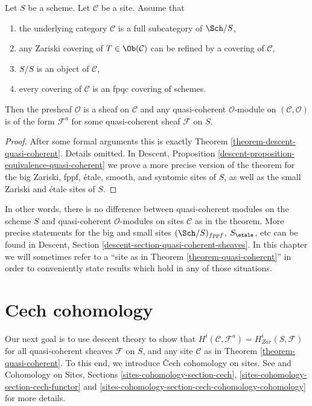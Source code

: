 \begin{theorem}
\label{theorem-quasi-coherent}
Let $S$ be a scheme.
Let $\mathcal{C}$ be a site. Assume that
\begin{enumerate}
\item the underlying category $\mathcal{C}$ is a
full subcategory of $\Sch/S$,
\item any Zariski covering of $T \in \Ob(\mathcal{C})$
can be refined by a covering of $\mathcal{C}$,
\item $S/S$ is an object of $\mathcal{C}$,
\item every covering of $\mathcal{C}$ is an fpqc covering of schemes.
\end{enumerate}
Then the presheaf $\mathcal{O}$ is a sheaf on $\mathcal{C}$ and
any quasi-coherent $\mathcal{O}$-module on $(\mathcal{C}, \mathcal{O})$
is of the form $\mathcal{F}^a$ for some quasi-coherent sheaf
$\mathcal{F}$ on $S$.
\end{theorem}

\begin{proof}
After some formal arguments this is exactly Theorem
\ref{theorem-descent-quasi-coherent}. Details omitted. In
Descent, Proposition \ref{descent-proposition-equivalence-quasi-coherent}
we prove a more precise version of the theorem for the
big Zariski, fppf, \'etale, smooth, and syntomic sites of $S$,
as well as the small Zariski and \'etale sites of $S$.
\end{proof}

\noindent
In other words, there is no difference between quasi-coherent
modules on the scheme $S$ and quasi-coherent $\mathcal{O}$-modules
on sites $\mathcal{C}$ as in the theorem. More precise statements
for the big and small sites $(\Sch/S)_{fppf}$, $S_\etale$, etc
can be found in
Descent, Section \ref{descent-section-quasi-coherent-sheaves}.
In this chapter we will sometimes refer to a
``site as in Theorem \ref{theorem-quasi-coherent}''
in order to conveniently state results which hold in any of those
situations.






\section{Cech cohomology}
\label{section-cech-cohomology}

\noindent
Our next goal is to use descent theory to show that
$H^i(\mathcal{C}, \mathcal{F}^a) = H_{Zar}^i(S, \mathcal{F})$
for all quasi-coherent sheaves $\mathcal{F}$ on $S$, and
any site $\mathcal{C}$ as in Theorem \ref{theorem-quasi-coherent}.
To this end, we introduce {\v C}ech cohomology on sites.
See \cite{ArtinTopologies} and
Cohomology on Sites, Sections \ref{sites-cohomology-section-cech},
\ref{sites-cohomology-section-cech-functor}
and \ref{sites-cohomology-section-cech-cohomology-cohomology}
for more details.

